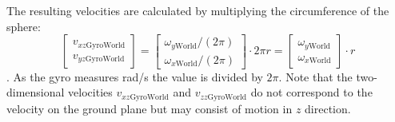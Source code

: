 \documentclass[letterpaper, 10 pt, conference]{ieeeconf}  %
\begin{document}
The resulting velocities are calculated by multiplying the circumference of the sphere:
\begin{equation}
\begin{bmatrix}
v_{xz\text{GyroWorld}} \\ v_{yz\text{GyroWorld}}
\end{bmatrix} = 
\begin{bmatrix}
\omega_{y\text{World}}/(2 \pi ) \\ \omega_{x\text{World}} / (2 \pi)
\end{bmatrix}
\cdot 2\pi r = \begin{bmatrix}
\omega_{y\text{World}}\\ \omega_{x\text{World}} 
\end{bmatrix}
\cdot r 
\end{equation}.
As the gyro measures rad/s the value is divided by $2\pi$.
Note that the two-dimensional velocities $v_{xz\text{GyroWorld}}$ and $v_{zz\text{GyroWorld}}$ do not correspond to the velocity on the ground plane but may consist of motion in $z$ direction. 
\end{document}
